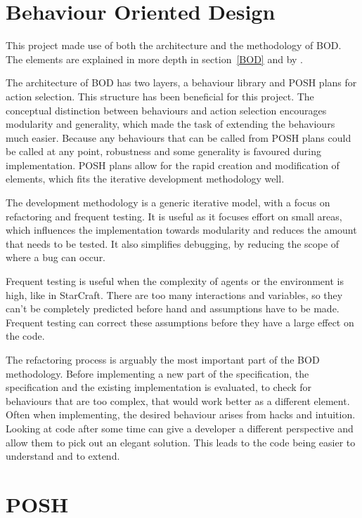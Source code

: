 \documentclass[11pt,openright,a4paper]{report}
\begin{document}
\section{Behaviour Oriented Design}
This project made use of both the architecture and the methodology of BOD. The elements are explained in more depth in section~\ref{BOD} and by .

The architecture of BOD has two layers, a behaviour library and POSH plans for action selection. This structure has been beneficial for this project. The conceptual distinction between behaviours and action selection encourages modularity and generality, which made the task of extending the behaviours much easier. Because any behaviours that can be called from POSH plans could be called at any point, robustness and some generality is favoured during implementation.  POSH plans allow for the rapid creation and modification of elements, which fits the iterative development methodology well.

The development methodology is a generic iterative model, with a focus on refactoring and frequent testing. It is useful as it focuses effort on small areas, which influences the implementation towards modularity and reduces the amount that needs to be tested. It also simplifies debugging, by reducing the scope of where a bug can occur.

Frequent testing is useful when the complexity of agents or the environment is high, like in StarCraft. There are too many interactions and variables, so they can't be completely predicted before hand and assumptions have to be made. Frequent testing can correct these assumptions before they have a large effect on the code.

The refactoring process is arguably the most important part of the BOD methodology. Before implementing a new part of the specification, the specification and the existing implementation is evaluated, to check for behaviours that are too complex, that would work better as a different element. Often when implementing, the desired behaviour arises from hacks and intuition. Looking at code after some time can give a developer a different perspective and allow them to pick out an elegant solution. This leads to the code being easier to understand and to extend.

\section{POSH}
\end{document}
